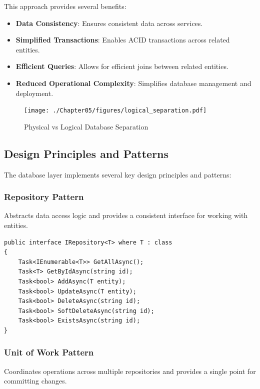 This approach provides several benefits:

\begin{itemize}
   \item \textbf{Data Consistency}: Ensures consistent data across services.
   \item \textbf{Simplified Transactions}: Enables ACID transactions across related entities.
   \item \textbf{Efficient Queries}: Allows for efficient joins between related entities.
   \item \textbf{Reduced Operational Complexity}: Simplifies database management and deployment.
\end{itemize}

\begin{figure}
    \centering
    \texttt{[image: ./Chapter05/figures/logical\_separation.pdf]}
    \caption{Physical vs Logical Database Separation}
    \label{fig:logical-separation}
\end{figure}
\clearpage

\subsection{Design Principles and Patterns}

The database layer implements several key design principles and patterns:

\subsubsection*{Repository Pattern}

Abstracts data access logic and provides a consistent interface for working with entities.

\begin{verbatim}
public interface IRepository<T> where T : class
{
    Task<IEnumerable<T>> GetAllAsync();
    Task<T> GetByIdAsync(string id);
    Task<bool> AddAsync(T entity);
    Task<bool> UpdateAsync(T entity);
    Task<bool> DeleteAsync(string id);
    Task<bool> SoftDeleteAsync(string id);
    Task<bool> ExistsAsync(string id);
}
\end{verbatim}

\subsubsection*{Unit of Work Pattern}

Coordinates operations across multiple repositories and provides a single point for committing changes.

